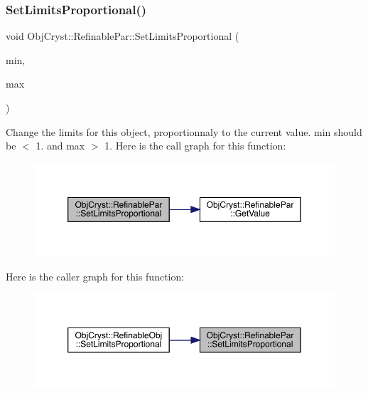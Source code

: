 \subsubsection{\texorpdfstring{SetLimitsProportional()}{SetLimitsProportional()}}
{\footnotesize\ttfamily void Obj\+Cryst\+::\+Refinable\+Par\+::\+Set\+Limits\+Proportional (\begin{DoxyParamCaption}\item[{const R\+E\+AL}]{min,  }\item[{const R\+E\+AL}]{max }\end{DoxyParamCaption})}

Change the limits for this object, proportionnaly to the current value. min should be $<$ 1. and max $>$ 1. Here is the call graph for this function\+:
\nopagebreak
\begin{figure}[H]
\begin{center}
\leavevmode
\includegraphics[width=350pt]{class_obj_cryst_1_1_refinable_par_afb15606bb24a5fbb144d07843bb11f97_cgraph}
\end{center}
\end{figure}
Here is the caller graph for this function\+:
\nopagebreak
\begin{figure}[H]
\begin{center}
\leavevmode
\includegraphics[width=350pt]{class_obj_cryst_1_1_refinable_par_afb15606bb24a5fbb144d07843bb11f97_icgraph}
\end{center}
\end{figure}
\mbox{\label{class_obj_cryst_1_1_refinable_par_ad445354c927f8df95443a55174e7bb7d}} 
